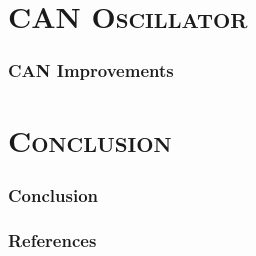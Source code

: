 \documentclass[xcolor=x11names,compress]{beamer}
\renewcommand{\(}{\begin{columns}}
\renewcommand{\)}{\end{columns}}
\newcommand{\<}[1]{\begin{column}{#1}}
\renewcommand{\>}{\end{column}}
\begin{document}
\section{\scshape CAN Oscillator}
\begin{frame}
  \frametitle{CAN Improvements}
\end{frame}

\section{\scshape Conclusion}

\begin{frame}
  \frametitle{Conclusion}
\end{frame}

\begin{frame}
  \frametitle{References}
  \scriptsize
  
  
\end{frame}
\end{document}
